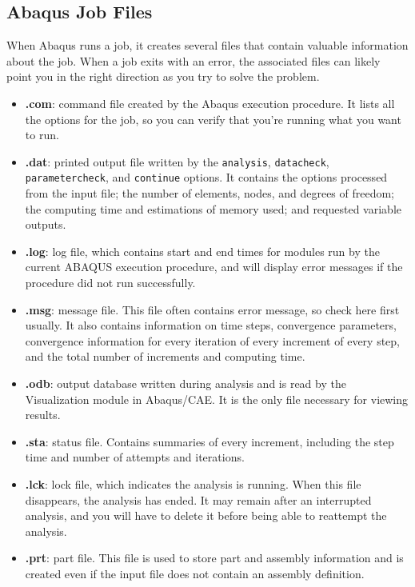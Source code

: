 \documentclass[10pt,letterpaper,oneside]{report}
\begin{document}
\subsection{Abaqus Job Files}
When Abaqus runs a job, it creates several files that contain valuable information about the job.  When a job exits with an error, the associated files can likely point you in the right direction as you try to solve the problem.  
\begin{itemize}
\item \textbf{.com}: command file created by the Abaqus execution procedure.  It lists all the options for the job, so you can verify that you're running what you want to run.
\item \textbf{.dat}: printed output file written by the \texttt{analysis}, \texttt{datacheck}, \texttt{parametercheck}, and \texttt{continue} options.  It contains the options processed from the input file; the number of elements, nodes, and degrees of freedom; the computing time and estimations of memory used; and requested variable outputs.
\item \textbf{.log}: log file, which contains start and end times for modules run by the current ABAQUS execution procedure, and will display error messages if the procedure did not run successfully.
\item \textbf{.msg}: message file.  This file often contains error message, so check here first usually.  It also contains information on time steps, convergence parameters, convergence information for every iteration of every increment of every step, and the total number of increments and computing time.
\item \textbf{.odb}: output database written during analysis and is read by the Visualization module in Abaqus/CAE.  It is the only file necessary for viewing results.
\item \textbf{.sta}: status file.  Contains summaries of every increment, including the step time and number of attempts and iterations.
\item \textbf{.lck}: lock file, which indicates the analysis is running.  When this file disappears, the analysis has ended.  It may remain after an interrupted analysis, and you will have to delete it before being able to reattempt the analysis.
\item \textbf{.prt}:  part file.  This file is used to store part and assembly information and is created even if the input file does not contain an assembly definition.
\end{itemize}
\end{document}

